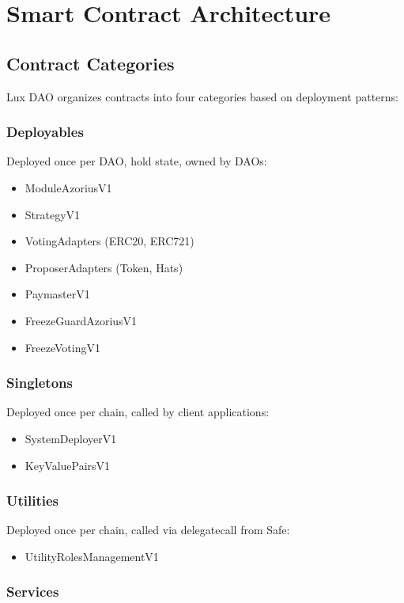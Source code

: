 \documentclass[11pt,a4paper]{article}
\begin{document}
\section{Smart Contract Architecture}

\subsection{Contract Categories}

Lux DAO organizes contracts into four categories based on deployment patterns:

\subsubsection{Deployables}

Deployed once per DAO, hold state, owned by DAOs:
\begin{itemize}
    \item ModuleAzoriusV1
    \item StrategyV1
    \item VotingAdapters (ERC20, ERC721)
    \item ProposerAdapters (Token, Hats)
    \item PaymasterV1
    \item FreezeGuardAzoriusV1
    \item FreezeVotingV1
\end{itemize}

\subsubsection{Singletons}

Deployed once per chain, called by client applications:
\begin{itemize}
    \item SystemDeployerV1
    \item KeyValuePairsV1
\end{itemize}

\subsubsection{Utilities}

Deployed once per chain, called via delegatecall from Safe:
\begin{itemize}
    \item UtilityRolesManagementV1
\end{itemize}

\subsubsection{Services}
\end{document}
